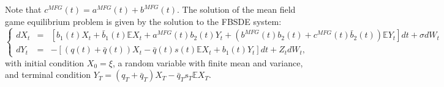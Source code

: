 \documentclass[11pt]{article}
\begin{document}
Note that $c^{MFG}(t)=a^{MFG}(t)+b^{MFG}(t)$. The solution of the mean field game equilibrium problem is given by the solution to the FBSDE system:
\begin{equation}
\left\{
\begin{array}{lcl}
      \displaystyle  dX_t&=& \left[b_1(t)X_t+\bar{b}_1(t) \mathbb{E}X_t+a^{MFG}(t)b_2(t)Y_t+(b^{MFG}(t)b_2(t)+c^{MFG}(t)\bar{b}_2(t))\mathbb{E}Y_t\right]dt+\sigma dW_t \\[5pt]
        dY_t&=& -\left[(q(t)+\bar{q}(t))X_t-\bar{q}(t)s(t)\mathbb{E}X_t+b_1(t)Y_t \right]dt +Z_t dW_t,
\end{array}
\right.
\label{eq:FBSDE_EMFG}
\end{equation}
with initial condition $X_0=\xi$, a random variable with finite mean and variance, and terminal condition $Y_T=(q_T+\bar{q}_T)X_T-\bar{q}_Ts_T\mathbb{E}X_T$.
\end{document}
